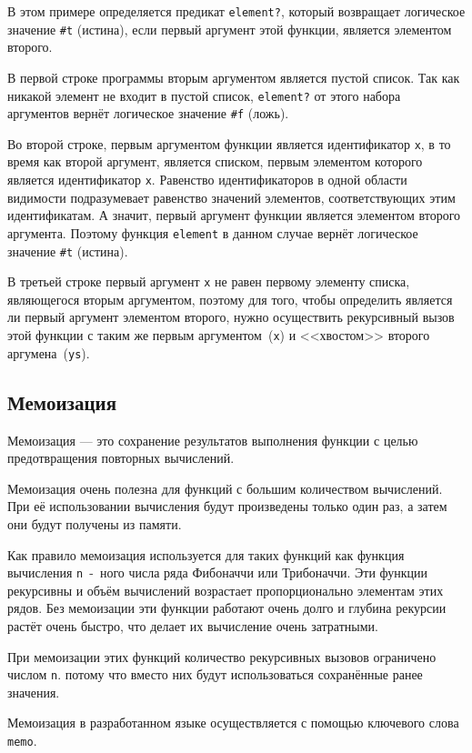    В этом примере определяется предикат \verb,element?,, который возвращает логическое значение \verb,#t, (истина), если первый аргумент этой функции, является элементом второго.

    В первой строке программы вторым аргументом является пустой список.
    Так как никакой элемент не входит в пустой список, \verb,element?, от этого набора аргументов вернёт логическое значение \verb,#f, (ложь).

    Во второй строке, первым аргументом функции является идентификатор \verb,x,, в то время как второй аргумент, является списком, первым элементом которого является идентификатор \verb,x,.
    Равенство идентификаторов в одной области видимости подразумевает равенство значений элементов, соответствующих этим идентификатам.
    А значит, первый аргумент функции является элементом второго аргумента.
    Поэтому функция \verb,element, в данном случае вернёт логическое значение \verb,#t, (истина).

    В третьей строке первый аргумент \verb$x$ не равен первому элементу списка, являющегося вторым аргументом, поэтому для того, чтобы определить является ли первый аргумент элементом второго, нужно осуществить рекурсивный вызов этой функции с таким же первым аргументом~(\verb,x,) и <<хвостом>> второго аргумена~(\verb,ys,).

    \subsection{Мемоизация}

    Мемоизация --- это сохранение результатов выполнения функции с целью предотвращения повторных вычислений.

    Мемоизация очень полезна для функций с большим количеством вычислений.
    При её использовании вычисления будут произведены только один раз, а затем они будут получены из памяти.

    Как правило мемоизация используется для таких функций как функция вычисления \verb,n,~-~ного числа ряда Фибоначчи или Трибоначчи.
    Эти функции рекурсивны и объём вычислений возрастает пропорционально элементам этих рядов.
    Без мемоизации эти функции работают очень долго и глубина рекурсии растёт очень быстро, что делает их вычисление очень затратными.

    При мемоизации этих функций количество рекурсивных вызовов ограничено числом \verb,n,. потому что вместо них будут использоваться сохранённые ранее значения.

    Мемоизация в разработанном языке осуществляется с помощью ключевого слова \verb,memo,.

